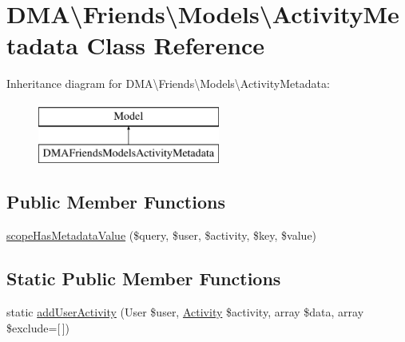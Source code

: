 \hypertarget{classDMA_1_1Friends_1_1Models_1_1ActivityMetadata}{}\section{D\+M\+A\textbackslash{}Friends\textbackslash{}Models\textbackslash{}Activity\+Metadata Class Reference}
\label{classDMA_1_1Friends_1_1Models_1_1ActivityMetadata}
Inheritance diagram for D\+M\+A\textbackslash{}Friends\textbackslash{}Models\textbackslash{}Activity\+Metadata\+:\begin{figure}[H]
\begin{center}
\leavevmode
\includegraphics[height=2.000000cm]{de/d4f/classDMA_1_1Friends_1_1Models_1_1ActivityMetadata}
\end{center}
\end{figure}
\subsection*{Public Member Functions}
\begin{DoxyCompactItemize}
\item 
\hyperlink{classDMA_1_1Friends_1_1Models_1_1ActivityMetadata_a93dc8a8c1ebf8bbe7f56e665751597ab}{scope\+Has\+Metadata\+Value} (\$query, \$user, \$activity, \$key, \$value)
\end{DoxyCompactItemize}
\subsection*{Static Public Member Functions}
\begin{DoxyCompactItemize}
\item 
static \hyperlink{classDMA_1_1Friends_1_1Models_1_1ActivityMetadata_ae65caa4e45de84ab2518f465d328fc24}{add\+User\+Activity} (User \$user, \hyperlink{classDMA_1_1Friends_1_1Models_1_1Activity}{Activity} \$activity, array \$data, array \$exclude=\mbox{[}$\,$\mbox{]})
\end{DoxyCompactItemize}
